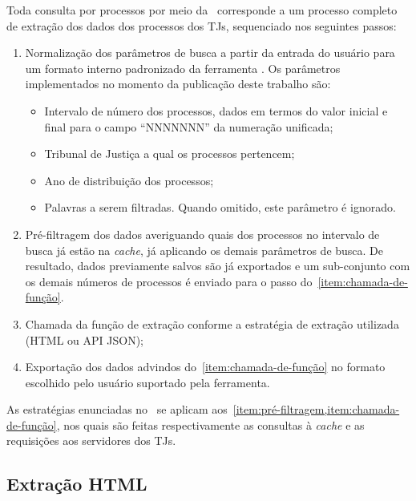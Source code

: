 Toda consulta por processos por meio da \tjscraper~corresponde a um processo
completo de extração dos dados dos processos dos TJs, sequenciado nos seguintes
passos:

\begin{enumerate}
    \item Normalização dos parâmetros de busca a partir da entrada do usuário
        para um formato interno padronizado da ferramenta \tjscraper. Os
        parâmetros implementados no momento da publicação deste trabalho são:

        \begin{itemize}
            \item Intervalo de número dos processos, dados em termos do valor
                inicial e final para o campo ``NNNNNNN'' da numeração
                unificada;
            \item Tribunal de Justiça a qual os processos pertencem;
            \item Ano de distribuição dos processos;
            \item Palavras a serem filtradas. Quando omitido, este parâmetro é
                ignorado.
        \end{itemize}
    \item \label{item:pré-filtragem} Pré-filtragem dos dados averiguando quais
        dos processos no intervalo de busca já estão na \textit{cache}, já
        aplicando os demais parâmetros de busca. De resultado, dados
        previamente salvos são já exportados e um sub-conjunto com os demais
        números de processos é enviado para o passo
        do~\cref{item:chamada-de-função}.
    \item \label{item:chamada-de-função} Chamada da função de extração conforme
        a estratégia de extração utilizada (HTML ou API JSON);
    \item Exportação dos dados advindos do~\cref{item:chamada-de-função} no
        formato escolhido pelo usuário suportado pela ferramenta.
\end{enumerate}

As estratégias enunciadas no~ se aplicam
aos~\cref{item:pré-filtragem,item:chamada-de-função}, nos quais são feitas
respectivamente as consultas à \textit{cache} e as requisições aos servidores
dos TJs.

\subsection{Extração HTML}

